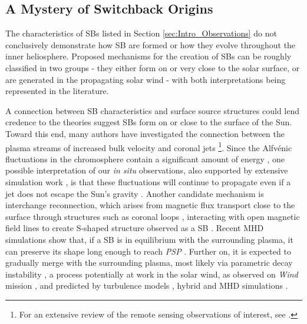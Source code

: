 \documentclass[]{aastex62}
\begin{document}
\subsection{A Mystery of Switchback Origins}
\label{sec:Intro_Origins}

The characteristics of SBs listed in Section \ref{sec:Intro_Observations} do not conclusively demonstrate how SB are formed or how they evolve throughout the inner heliosphere. Proposed mechanisms for the creation of SBs can be roughly classified in two groups - they either form on or very close to the solar surface, or are generated in the propagating solar wind - with both interpretations being represented in the literature. 

A connection between SB characteristics and surface source structures could lend credence to the theories suggest SBs form on or close to the surface of the Sun. Toward this end, many authors have investigated the connection between the plasma streams of increased bulk velocity and coronal jets \citep{McComas_1995_JGR,Neugebauer_1995_JGR,Culhane_2007_PASJ,Patsourakos_2008_ApJ,Neugebauer_2012_ApJ,Tian_2014_Science}\footnote{For an extensive review of the remote sensing observations of interest, see \cite{Raouafi_2016_SSRv}.}. Since the Alfv\'enic fluctuations in the chromosphere contain a significant amount of energy \citep{DePontieu_2007_Science}, one possible interpretation of our \emph{in situ} observations, also supported by extensive simulation work \citep{Uritsky_2017_ApJ,Wyper_2017_Nature,Roberts_2018_ApJ}, is that these fluctuations will continue to propagate even if a jet does not escape the Sun's gravity \citep{Horbury_2020_ApJS}. Another candidate mechanism is interchange reconnection, which arises from magnetic flux transport close to the surface through structures such as coronal loops \citep{vanBallegooijen_1998_ApJ,Fisk_2001_ApJ,Fisk_2005_ApJ}, interacting with open magnetic field lines to create S-shaped structure observed as a SB \citep{Fisk_2020ApJL,Zank_2020_ApJ}. Recent MHD simulations show that, if a SB is in equilibrium with the surrounding plasma, it can preserve its shape long enough to reach \emph{PSP} \citep{Landi_2005_ApJ,Tenerani_2020_ApJS}. Further on, it is expected to gradually merge with the surrounding plasma, most likely via parametric decay instability \citep{Derby_1978_ApJ}, a process potentially at work in the solar wind, as observed on \emph{Wind} mission \citep{Bowen_2018_ApJL}, and predicted by turbulence models \citep{Chandran_2018_JPlPh}, hybrid \citep{Matteini_2010_GeoRL} and MHD simulations \citep{Tenerani_2013_JGRA,Primavera_2019_ApJ}.
\end{document}
